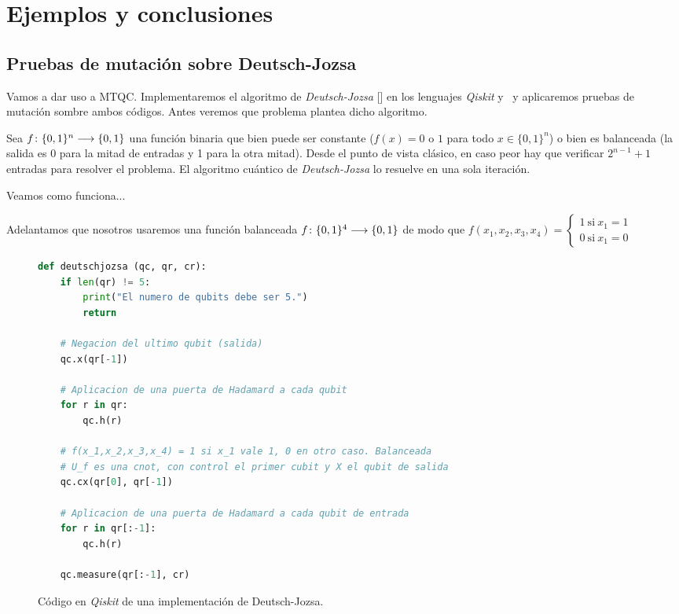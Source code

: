 \chapter{Ejemplos y conclusiones}

\section{Pruebas de mutación sobre Deutsch-Jozsa}

Vamos a dar uso a MTQC. Implementaremos el algoritmo de \textit{Deutsch-Jozsa} [\cite{deutsch1992rapid}] en los lenguajes \textit{Qiskit} y \qsh\ y aplicaremos pruebas de mutación sombre ambos códigos. Antes veremos que problema plantea dicho algoritmo.

Sea $f\colon \{0,1\}^n\longrightarrow \{0,1\}$ una función binaria que bien puede ser constante ($f(x) = 0$ o $1$ para todo $x\in\{0,1\}^n$) o bien es balanceada (la salida es 0 para la mitad de entradas y 1 para la otra mitad). Desde el punto de vista clásico, en caso peor hay que verificar $2^{n-1}+1$ entradas para resolver el problema. El algoritmo cuántico de \textit{Deutsch-Jozsa} lo resuelve en una sola iteración.

Veamos como funciona... %

Adelantamos que nosotros usaremos una función balanceada $f\colon \{0,1\}^4\longrightarrow \{0,1\}$ de modo que $f(x_1,x_2,x_3,x_4)=\left\{\begin{matrix}1 \mathrm{\ si\ } x_1=1\\0 \mathrm{\ si\ } x_1=0\end{matrix}\right.$

\begin{figure}[htb]
\begin{lstlisting}[language=Python]
def deutschjozsa (qc, qr, cr):
    if len(qr) != 5:
        print("El numero de qubits debe ser 5.")
        return
    
    # Negacion del ultimo qubit (salida)
    qc.x(qr[-1])
    
    # Aplicacion de una puerta de Hadamard a cada qubit
    for r in qr:
        qc.h(r)
        
    # f(x_1,x_2,x_3,x_4) = 1 si x_1 vale 1, 0 en otro caso. Balanceada
    # U_f es una cnot, con control el primer cubit y X el qubit de salida
    qc.cx(qr[0], qr[-1])
    
    # Aplicacion de una puerta de Hadamard a cada qubit de entrada
    for r in qr[:-1]:
        qc.h(r)
    
    qc.measure(qr[:-1], cr)
\end{lstlisting}
\caption{Código en \textit{Qiskit} de una implementación de Deutsch-Jozsa.}
\label{fig:code61}
\end{figure}

